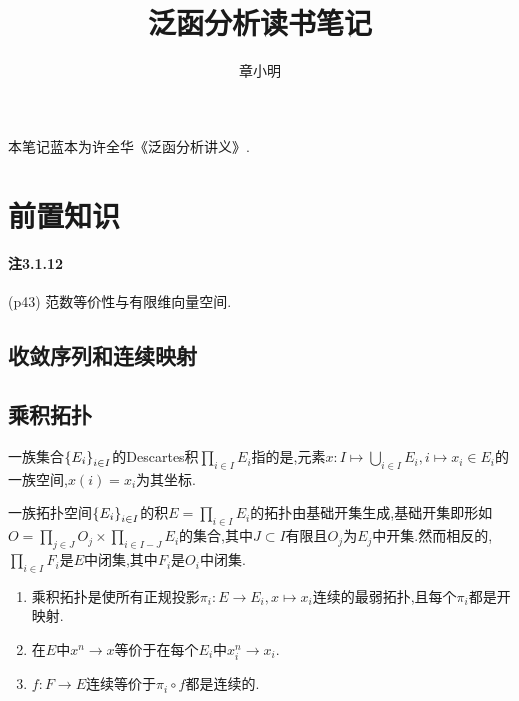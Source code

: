 \documentclass{article}
\title{泛函分析读书笔记}
\author{章小明}
\begin{document}
\maketitle
\tableofcontents
本笔记蓝本为许全华《泛函分析讲义》.


\section{前置知识}
\paragraph{注3.1.12}(p43) 范数等价性与有限维向量空间.

\subsection{收敛序列和连续映射}

\subsection{乘积拓扑}
一族集合$\left\{E_i\right\}_{i\in I}$的Descartes积$\prod_{i\in I}E_i$指的是,元素$x:I\mapsto \bigcup_{i\in I}E_i, i\mapsto x_i\in E_i$的一族空间,$x(i)=x_i$为其坐标.

一族拓扑空间$\left\{E_i\right\}_{i\in I}$的积$E=\prod_{i\in I}E_i$的拓扑由基础开集生成,基础开集即形如$O=\prod_{j\in J}O_j\times \prod_{i\in I-J}E_i$的集合,其中$J\subset I$有限且$O_j$为$E_j$中开集.然而相反的,$\prod_{i\in I} F_i$是$E$中闭集,其中$F_i$是$O_i$中闭集.

\begin{enumerate}
    \item 乘积拓扑是使所有正规投影$\pi_i:E\to E_i, x\mapsto x_i$连续的最弱拓扑,且每个$\pi_i$都是开映射.\\
    \item 在$E$中$x^n\to x$等价于在每个$E_i$中$x^n_i\to x_i$.\\\tbc
    \item $f:F\to E$连续等价于$\pi_i\circ f$都是连续的.
\end{enumerate}
\end{document}
